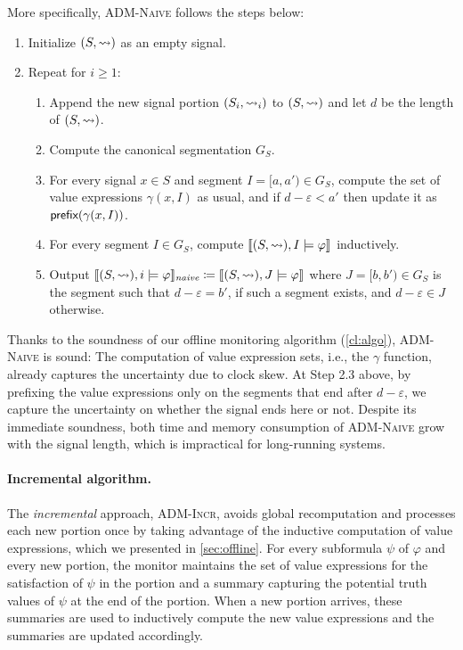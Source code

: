 More specifically, \textsc{ADM-Naive} follows the steps below:
\begin{enumerate}[label*=\arabic*.]
	\item Initialize $(S,{\rightsquigarrow})$ as an empty signal.
	\item Repeat for $i \geq 1$:
	\begin{enumerate}[leftmargin=5pt,label*=\arabic*]
		\item Append the new signal portion $(S_i,{\rightsquigarrow}_i)$ to $(S,{\rightsquigarrow})$ and let $d$ be the length of $(S,{\rightsquigarrow})$.
		\item Compute the canonical segmentation $G_S$.
		\item For every signal $x \in S$ and segment $I = [a, a') \in G_S$, compute the set of value expressions $\gamma(x,I)$ as usual, and if $d-\varepsilon < a'$ then update it as $\textsf{prefix}(\gamma(x,I))$.
		\item For every segment $I \in G_S$, compute $\llbracket (S, {\rightsquigarrow}), I \models \varphi \rrbracket$ inductively.
		\item Output $\llbracket (S, {\rightsquigarrow}), i \models \varphi \rrbracket_{\textit{naive}} \coloneqq \llbracket (S, {\rightsquigarrow}), J \models \varphi \rrbracket$ where $J = [b,b') \in G_S$ is the segment such that $d - \varepsilon = b'$, if such a segment exists, and $d - \varepsilon \in J$ otherwise.
	\end{enumerate}
\end{enumerate}
Thanks to the soundness of our offline monitoring algorithm (\cref{cl:algo}), \textsc{ADM-Naive} is sound:
The computation of value expression sets, i.e., the $\gamma$ function, already captures the uncertainty due to clock skew.
At Step 2.3 above, by prefixing the value expressions only on the segments that end after $d-\varepsilon$, we capture the uncertainty on whether the signal ends here or not.
Despite its immediate soundness, both time and memory consumption of \textsc{ADM-Naive} grow with the signal length, which is impractical for long-running systems.

\paragraph*{Incremental algorithm.}
The \emph{incremental} approach, \textsc{ADM-Incr}, avoids global recomputation and processes each new portion once by taking advantage of the inductive computation of value expressions, which we presented in \cref{sec:offline}.
For every subformula $\psi$ of $\varphi$ and every new portion, the monitor maintains the set of value expressions for the satisfaction of $\psi$ in the portion and a summary capturing the potential truth values of $\psi$ at the end of the portion.
When a new portion arrives, these summaries are used to inductively compute the new value expressions and the summaries are updated accordingly.

